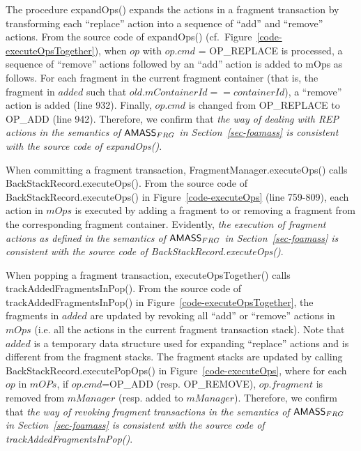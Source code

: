 The procedure expandOps() expands the actions in a fragment transaction by transforming each ``replace'' action into a sequence of ``add'' and ``remove'' actions. 
From the source code of expandOps() (cf.\ Figure~\ref{code-executeOpsTogether}), when $op$ with $op.cmd$ = OP\_REPLACE is processed, a sequence of ``remove'' actions followed by an ``add'' action is added to mOps as follows. For each fragment in the current fragment container (that is, the fragment in $added$ such that $old.mContainerId == containerId$), a ``remove'' action is added (line 932). Finally, $op.cmd$ is changed from  OP\_REPLACE to OP\_ADD (line 942). 
Therefore, we confirm that \emph{the way of dealing with REP actions in the semantics of $\textsf{AMASS}_{FRG}$ in Section~\ref{sec-foamass} is consistent with the source code of expandOps()}. 



When committing a fragment transaction, FragmentManager.executeOps() calls BackStackRecord.executeOps(). From the source code of BackStackRecord.executeOps() in Figure~\ref{code-executeOps} (line 759-809), each action in $mOps$ is executed by adding a fragment to or removing a fragment from the corresponding fragment container. Evidently, \emph{the execution of fragment actions as defined in the semantics of $\textsf{AMASS}_{FRG}$ in Section~\ref{sec-foamass} is consistent with the source code of BackStackRecord.executeOps()}.

When popping a fragment transaction, executeOpsTogether() calls trackAddedFragmentsInPop().  
From the source code of trackAddedFragmentsInPop() in Figure~\ref{code-executeOpsTogether}, the fragments in $added$ are updated by revoking all ``add'' or ``remove'' actions in $mOps$ (i.e. all the actions in the current fragment transaction stack). Note that $added$ is a temporary data structure used for expanding ``replace'' actions and is different from the fragment stacks. The fragment stacks are updated by calling BackStackRecord.executePopOps() in Figure~\ref{code-executeOps}, where for each $op$ in $mOPs$, if $op.cmd$=OP\_ADD (resp. OP\_REMOVE), $op.fragment$ is removed from $mManager$ (resp. added to $mManager$). Therefore, we confirm that \emph{the way of revoking fragment transactions in the semantics of $\textsf{AMASS}_{FRG}$ in Section~\ref{sec-foamass} is consistent with the source code of trackAddedFragmentsInPop()}. 




